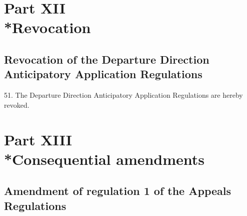 \documentclass[12pt,a4paper]{article}
\begin{document}

\section[Part XII --- Revocation]{Part XII\\*Revocation}

\renewcommand\parthead{--- Part XII}

\subsection[51. Revocation of the Departure Direction Anticipatory Application
Regulations]{Revocation of the Departure Direction Anticipatory Application
Regulations}

51. The Departure Direction Anticipatory Application Regulations are
hereby revoked.

\section[Part XIII --- Consequential amendments]{Part XIII\\*Consequential amendments}

\renewcommand\parthead{--- Part XIII}

\subsection[52. Amendment of regulation 1 of the Appeals
Regulations]{Amendment of regulation 1 of the Appeals
Regulations}
\end{document}
